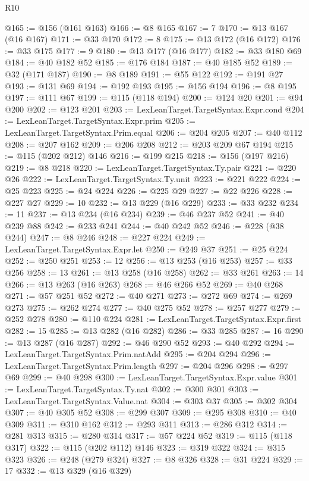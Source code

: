 \begin{lexlean}{R10}
\begin{coremodule}
@165 := @156 (@161 @163)
@166 := @8 @165
@167 := 7
@170 := @13 @167 (@16 @167)
@171 := @33 @170
@172 := 8
@175 := @13 @172 (@16 @172)
@176 := @33 @175
@177 := 9
@180 := @13 @177 (@16 @177)
@182 := @33 @180 @69
@184 := @40 @182 @52
@185 := @176 @184
@187 := @40 @185 @52
@189 := @32 (@171 @187)
@190 := @8 @189
@191 := @55 @122
@192 := @191 @27
@193 := @131 @69
@194 := @192 @193
@195 := @156 @194
@196 := @8 @195
@197 := @111 @67
@199 := @115 (@118 @194)
@200 := @124 @20
@201 := @94 @200
@202 := @123 @201
@203 := LexLeanTarget.TargetSyntax.Expr.cond
@204 := LexLeanTarget.TargetSyntax.Expr.prim
@205 := LexLeanTarget.TargetSyntax.Prim.equal
@206 := @204 @205
@207 := @40 @112
@208 := @207 @162
@209 := @206 @208
@212 := @203 @209 @67 @194
@215 := @115 (@202 @212) @146
@216 := @199 @215
@218 := @156 (@197 @216)
@219 := @8 @218
@220 := LexLeanTarget.TargetSyntax.Ty.pair
@221 := @220 @26
@222 := LexLeanTarget.TargetSyntax.Ty.unit
@223 := @221 @222
@224 := @25 @223
@225 := @24 @224
@226 := @225 @29
@227 := @22 @226
@228 := @227 @27
@229 := 10
@232 := @13 @229 (@16 @229)
@233 := @33 @232
@234 := 11
@237 := @13 @234 (@16 @234)
@239 := @46 @237 @52
@241 := @40 @239 @88
@242 := @233 @241
@244 := @40 @242 @52
@246 := @228 (@38 @244)
@247 := @8 @246
@248 := @227 @224
@249 := LexLeanTarget.TargetSyntax.Expr.let
@250 := @249 @37
@251 := @25 @224
@252 := @250 @251
@253 := 12
@256 := @13 @253 (@16 @253)
@257 := @33 @256
@258 := 13
@261 := @13 @258 (@16 @258)
@262 := @33 @261
@263 := 14
@266 := @13 @263 (@16 @263)
@268 := @46 @266 @52
@269 := @40 @268
@271 := @57 @251 @52
@272 := @40 @271
@273 := @272 @69
@274 := @269 @273
@275 := @262 @274
@277 := @40 @275 @52
@278 := @257 @277
@279 := @252 @278
@280 := @110 @224
@281 := LexLeanTarget.TargetSyntax.Expr.first
@282 := 15
@285 := @13 @282 (@16 @282)
@286 := @33 @285
@287 := 16
@290 := @13 @287 (@16 @287)
@292 := @46 @290 @52
@293 := @40 @292
@294 := LexLeanTarget.TargetSyntax.Prim.natAdd
@295 := @204 @294
@296 := LexLeanTarget.TargetSyntax.Prim.length
@297 := @204 @296
@298 := @297 @69
@299 := @40 @298
@300 := LexLeanTarget.TargetSyntax.Expr.value
@301 := LexLeanTarget.TargetSyntax.Ty.nat
@302 := @300 @301
@303 := LexLeanTarget.TargetSyntax.Value.nat
@304 := @303 @37
@305 := @302 @304
@307 := @40 @305 @52
@308 := @299 @307
@309 := @295 @308
@310 := @40 @309
@311 := @310 @162
@312 := @293 @311
@313 := @286 @312
@314 := @281 @313
@315 := @280 @314
@317 := @57 @224 @52
@319 := @115 (@118 @317)
@322 := @115 (@202 @112) @146
@323 := @319 @322
@324 := @315 @323
@326 := @248 (@279 @324)
@327 := @8 @326
@328 := @31 @224
@329 := 17
@332 := @13 @329 (@16 @329)

\end{coremodule}
\end{lexlean}
